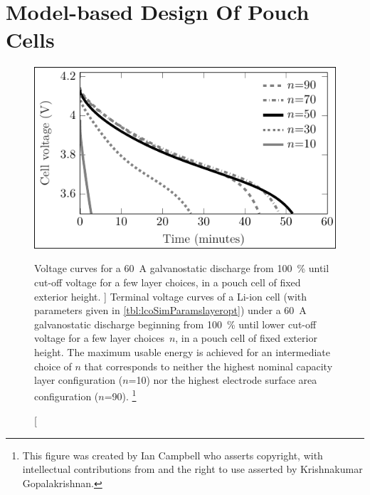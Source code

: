 
\graphicspath{{chapters/layer_opt/figures/}}

\chapter{Model-based Design Of Pouch Cells}\label{ch:modelbaseddesign}
\vspace*{-1em}
\startcontents[chapters]

\bigskip

\begin{figure}[!bp]
    \begin{minipage}[t]{\textwidth}
        \centering
        \includegraphics[trim=4 4 2 4,clip]{fig_CC_discharge_curves.pdf}
        \caption
        [%
        Voltage  curves   for  a   \SI{60}{\ampere}  galvanostatic   discharge  from
        \SI{100}{\percent}   until cut-off voltage for  a few layer
        choices, in a pouch cell of fixed exterior height.
        ]%
        {%
            Terminal  voltage   curves  of   a  Li-ion  cell   (with  parameters
            given in  \cref{tbl:lcoSimParamslayeropt}) under  a \SI{60}{\ampere}
            galvanostatic    discharge    beginning   from    \SI{100}{\percent}
              until  lower  cut-off  voltage for  a  few  layer
            choices~$n$, in a  pouch cell of fixed exterior  height. The maximum
            usable  energy  is  achieved  for  an  intermediate  choice  of  $n$
            that  corresponds  to neither  the  highest  nominal capacity  layer
            configuration ($n$=\num{10}) nor the  highest electrode surface area
            configuration ($n$=\num{90})\footnotemark.
        }%
        \label{fig:fig_CC_discharge_curves}
        \mpfootnotes[1]
        \footnote{This figure was created by Ian Campbell who asserts copyright,
            with  intellectual  contributions  from  and   the  right  to  use  asserted  by
        Krishnakumar Gopalakrishnan.}
    \end{minipage}
\end{figure}


